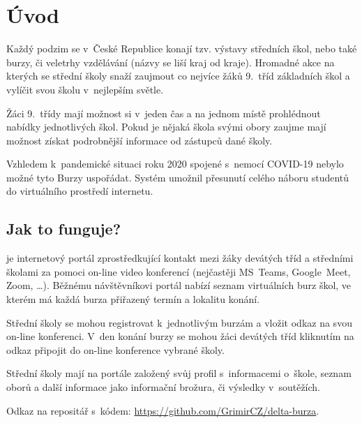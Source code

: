 \chapter*{Úvod}

Každý podzim se v~České Republice konají tzv. výstavy středních škol, nebo také burzy, či veletrhy vzdělávání (názvy se liší kraj od kraje).
  Hromadné akce na kterých se střední školy snaží zaujmout co nejvíce žáků 9.~tříd základních škol a vylíčit svou školu v~nejlepším světle.

Žáci 9.~třídy mají možnost si v~jeden čas a na jednom místě prohlédnout nabídky jednotlivých škol.
Pokud je nějaká škola svými obory zaujme mají možnost získat podrobnější informace od zástupců dané školy. 

Vzhledem k~pandemické situaci roku 2020 spojené s~nemocí COVID\hbox{-}19 nebylo možné tyto Burzy uspořádat. Systém \bso{} umožnil přesunutí celého náboru studentů do virtuálního prostředí internetu.

\section*{Jak to funguje?}
\bso{} je internetový portál zprostředkující kontakt mezi žáky devátých tříd a středními školami za pomoci on-line video konferencí (nejčastěji MS~Teams\cite{ms-teams}, Google~Meet\cite{google-meet}, Zoom\cite{zoom}, \ldots). 
Běžnému návštěvníkovi portál nabízí seznam virtuálních burz škol, ve kterém má každá burza přiřazený termín a lokalitu konání.

Střední školy se mohou registrovat k~jednotlivým burzám a vložit odkaz na svou on-line konferenci. V~den konání burzy se mohou žáci devátých tříd kliknutím na odkaz připojit do on-line konference vybrané školy.

Střední školy mají na portále založený svůj profil s~informacemi o~škole, seznam oborů a další informace jako informační brožura, či výsledky v~soutěžích.

Odkaz na repositář s~kódem: \href{https://github.com/GrimirCZ/delta-burza}{https://github.com/GrimirCZ/delta-burza}.

\pagebreak

